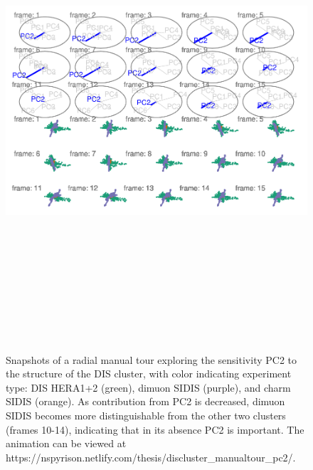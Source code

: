 \begin{Schunk}
\begin{figure}

{\centering \includegraphics[width=5.83in,height=7in]{spyrison-cook_files/figure-latex/DISclusterBad-1} 

}

\caption[Snapshots of a radial manual tour exploring the sensitivity PC2 to the structure of the DIS cluster, with color indicating experiment type]{Snapshots of a radial manual tour exploring the sensitivity PC2 to the structure of the DIS cluster, with color indicating experiment type: DIS HERA1+2 (green), dimuon SIDIS (purple), and charm SIDIS (orange). As contribution from PC2 is decreased, dimuon SIDIS becomes more distinguishable from the other two clusters (frames 10-14), indicating that in its absence PC2 is important. The animation can be viewed at https://nspyrison.netlify.com/thesis/discluster\_manualtour\_pc2/.}\label{fig:DISclusterBad}
\end{figure}
\end{Schunk}

